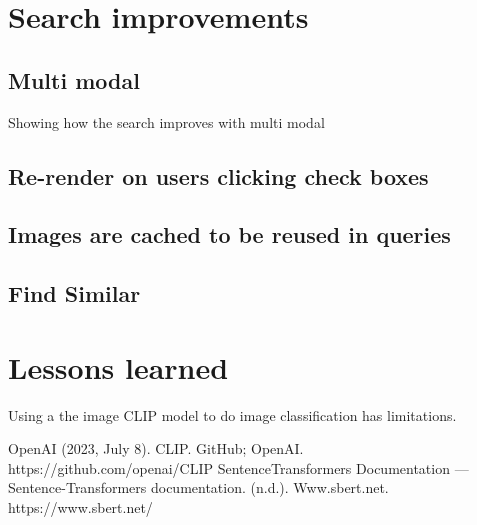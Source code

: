 \documentclass[article, 10pt]{article}
\begin{document}
\section{Search improvements}
\subsection{Multi modal}
Showing how the search improves with multi modal 
\subsection{Re-render on users clicking check boxes}
\subsection{Images are cached to be reused in queries}

\subsection{Find Similar}

\section{Lessons learned} 
Using a the image CLIP model to do image classification has limitations. 


\begin{thebibliography}{99}
 OpenAI (2023, July 8). CLIP. GitHub; OpenAI. https://github.com/openai/CLIP
 SentenceTransformers Documentation — Sentence-Transformers documentation. (n.d.). Www.sbert.net. https://www.sbert.net/


\end{thebibliography}
\end{document}
